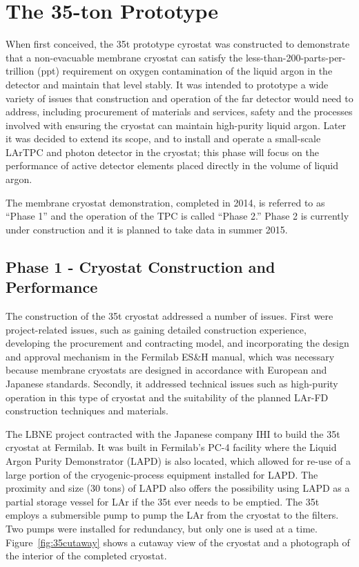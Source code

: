 \section{The 35-ton Prototype} 
\label{sec:proto-35t}

When first conceived, the 35t prototype cyrostat was constructed to demonstrate that a non-evacuable membrane cryostat can satisfy the less-than-200-parts-per-trillion (ppt) requirement on oxygen contamination of the liquid argon in the detector and maintain that level stably.
%
It was intended to prototype a wide variety of issues that construction and 
operation of the far detector would need to address, including procurement of 
materials and services, safety and the processes involved with ensuring the 
cryostat can maintain high-purity liquid argon. 
%
Later it was decided to extend its scope, and to install and operate a small-scale LArTPC and photon detector in the cryostat; this phase will focus on the performance of active detector elements placed directly in the volume of liquid argon.

The membrane cryostat demonstration, completed in 2014, is referred to as ``Phase 1'' and the operation of the TPC is called ``Phase 2.''
Phase 2 is currently under construction and it is planned to take data in summer 2015.

\subsection{Phase 1 - Cryostat Construction and Performance}

The construction of the 35t cryostat addressed a number of issues.
First were project-related issues, such as gaining detailed construction experience, 
developing the procurement and contracting model, and incorporating the design and approval mechanism 
in the Fermilab ES\&H manual, which was necessary because membrane cryostats are designed in accordance
with European and Japanese standards.
Secondly, it addressed technical issues such as %
high-purity operation in this type of 
cryostat and the suitability of the planned LAr-FD construction techniques and materials.

The LBNE project contracted with the Japanese company IHI to build the 35t cryostat at Fermilab.  
It was built in Fermilab's PC-4 facility where the Liquid Argon Purity Demonstrator (LAPD)
\cite{bib:lapdP07005}
is also located, which
allowed for re-use of a large portion of the cryogenic-process equipment installed for LAPD.
The proximity and size (30 tons) of LAPD also offers the possibility using LAPD as 
a partial storage vessel for LAr if the 35t ever needs to be emptied. 
The 35t employs a submersible %
pump to pump the LAr from the cryostat to the filters. Two pumps were installed for redundancy, but 
only one is used at a time.
Figure~\ref{fig:35cutaway} shows a cutaway view of the cryostat and a photograph of the interior
of the completed cryostat. 


